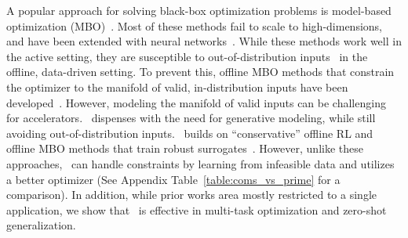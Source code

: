A popular approach for solving black-box optimization problems is model-based optimization (MBO)~\citep{snoek15scalable,shahriari2016TakingTH,snoek2012practical}.
%
Most of these methods fail to scale to high-dimensions, and have been extended with neural networks~\citep{snoek15scalable,snoek2012practical,kim2018attentive,garnelo18neural,garnelo18conditional,p3bo:arxiv:2020,angermueller2019model,mirhoseini2020chip}. While these methods work well in the active setting, they are susceptible to out-of-distribution inputs~\citep{trabucco2021designbench} in the offline, data-driven setting.
%
To prevent this, offline MBO methods that constrain the optimizer to the manifold of valid, in-distribution inputs have been developed~\citep{brookes19a,fannjiang2020autofocused,kumar2019model}.
%
However, modeling the manifold of valid inputs can be challenging for accelerators. \primemethodname\ dispenses with the need for generative modeling, while still avoiding out-of-distribution inputs. \primemethodname\  builds on ``conservative'' offline RL and offline MBO methods that train robust surrogates~\citep{kumar2020conservative,trabucco2021conservative}. However, unlike these approaches, \primemethodname\ can handle constraints by learning from infeasible data and utilizes a better optimizer (See Appendix Table~\ref{table:coms_vs_prime} for a comparison).
%
In addition, while prior works area mostly restricted to a single application, we show that \primemethodname\ is effective in multi-task optimization and zero-shot generalization.